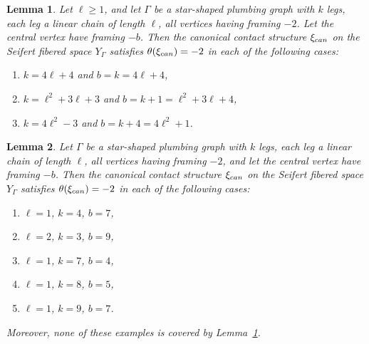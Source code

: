 \documentclass[10pt,a4paper]{amsart}
\newtheorem{lemma}{Lemma}
\begin{document}
\begin{lemma}\label{lem:theta-three-families}
Let $\ell \ge 1$, and let $\Gamma$ be a star-shaped plumbing graph with $k$ legs, each leg a linear chain of length $\ell$, all vertices having framing $-2$. Let the central vertex have framing $-b$. Then the canonical contact structure $\xi_{\rm can}$ on the Seifert fibered space $Y_\Gamma$ satisfies $\theta(\xi_{\rm can})=-2$ in each of the following cases:
\begin{enumerate}
\item[(1)] $k=4\ell+4$ and $b=k=4\ell+4$,
\item[(2)] $k=\ell^2+3\ell+3$ and $b=k+1=\ell^2+3\ell+4$,
\item[(3)] $k=4\ell^2-3$ and $b=k+4=4\ell^2+1$.
\end{enumerate}
\end{lemma}

\begin{lemma}\label{lem:theta-sporadic-examples}
Let $\Gamma$ be a star-shaped plumbing graph with $k$ legs, each leg a linear chain of length $\ell$, all vertices having framing $-2$, and let the central vertex have framing $-b$. Then the canonical contact structure $\xi_{\rm can}$ on the Seifert fibered space $Y_\Gamma$ satisfies $\theta(\xi_{\rm can})=-2$ in each of the following cases:
\begin{enumerate}
\item[(1)] $\ell=1$, $k=4$, $b=7$,
\item[(2)] $\ell=2$, $k=3$, $b=9$,
\item[(3)] $\ell=1$, $k=7$, $b=4$,
\item[(4)] $\ell=1$, $k=8$, $b=5$,
\item[(5)] $\ell=1$, $k=9$, $b=7$.
\end{enumerate}
Moreover, none of these examples is covered by Lemma~\ref{lem:theta-three-families}.
\end{lemma}
\end{document}

